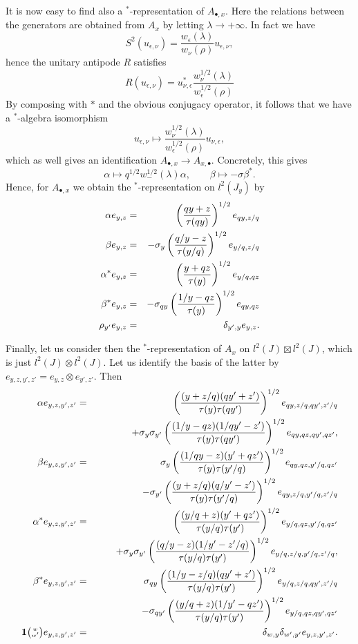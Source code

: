 It is now easy to find also a $^*$-representation of $A_{\bullet,x}$. Here the relations between the generators are obtained from $A_{x}$ by letting $\lambda\rightarrow +\infty$. In fact we have \[S^2(u_{\epsilon,\nu}) = \frac{w_{\epsilon}(\lambda)}{w_{\nu}(\rho)} u_{\epsilon,\nu},\] hence the unitary antipode $R$ satisfies \[ R(u_{\epsilon,\nu}) = u_{\nu,\epsilon}^* \frac{w_{\nu}^{1/2}(\lambda)}{w_{\epsilon}^{1/2}(\rho)}\] By composing with $*$ and the obvious conjugacy operator, it follows that we have a $^*$-algebra isomorphism \[u_{\epsilon,\nu} \mapsto  \frac{w_{\nu}^{1/2}(\lambda)}{w_{\epsilon}^{1/2}(\rho)}u_{\nu,\epsilon},\] which as well gives an identification $A_{\bullet,x}\rightarrow A_{x,\bullet}$. Concretely, this gives \[\alpha \mapsto q^{1/2}w_{-}^{1/2}(\lambda) \alpha,\qquad \beta \mapsto -\sigma\beta^*.\] Hence, for $A_{\bullet,x}$ we obtain the $^*$-representation on $l^2(J_{y})$ by \begin{eqnarray*} \alpha e_{y,z} &=&  \left(\frac{qy+z}{\operatorname{\tau}(qy)}\right)^{1/2}e_{qy,z/q}\\ \beta e_{y,z} &=&  - \sigma_{y} \left( \frac{q/y-z}{\operatorname{\tau}(y/q)}\right)^{1/2}e_{y/q,z/q}\\ \alpha^* e_{y,z} &=&  \left(\frac{y+qz}{\operatorname{\tau}(y)}\right)^{1/2}e_{y/q,qz}\\ \beta^* e_{y,z} &=&  - \sigma_{qy} \left( \frac{1/y-qz}{\operatorname{\tau}(y)}\right)^{1/2}e_{qy,qz}\\\rho_{y'}e_{y,z} &=& \delta_{y',y}e_{y,z}.\end{eqnarray*}

Finally, let us consider then the $^*$-representation of $A_{x}$ on $l^2(J)\boxtimes l^2(J)$, which is just $l^2(J)\otimes l^2(J)$. Let us identify the basis of the latter by $e_{y,z,y',z'} = e_{y,z}\otimes e_{y',z'}$. Then \begin{eqnarray*} \alpha e_{y,z,y',z'} &=& \left(\frac{(y+z/q)(qy'+z')}{\tau(y)\tau(qy')}\right)^{1/2}e_{qy,z/q,qy',z'/q}  \\ && \qquad + \sigma_{y}\sigma_{y'}\left(\frac{(1/y-qz)(1/qy' -z')}{\tau(y)\tau(qy')}\right)^{1/2}e_{qy,qz,qy',qz'}, \\
\beta e_{y,z,y',z'} &=&  \sigma_y \left(\frac{(1/qy-z)(y'+qz')}{\tau(y)\tau(y'/q)}\right)^{1/2}e_{qy,qz,y'/q,qz'}  \\ &&\qquad -\sigma_{y'}\left(\frac{(y+z/q)(q/y'-z')}{\tau(y)\tau(y'/q)}\right)^{1/2} e_{qy,z/q,y'/q,z'/q} \\\alpha^* e_{y,z,y',z'} &=& \left(\frac{(y/q+z)(y'+qz')}{\tau(y/q)\tau(y')}\right)^{1/2}e_{y/q,qz,y'/q,qz'}  \\ && \qquad + \sigma_{y}\sigma_{y'} \left(\frac{(q/y-z)(1/y' -z'/q)}{\tau(y/q)\tau(y')}\right)^{1/2}e_{y/q,z/q,y'/q,z'/q}, \\
\beta^* e_{y,z,y',z'} &=&  \sigma_{qy} \left(\frac{(1/y-z/q)(qy'+z')}{\tau(y/q)\tau(y')}\right)^{1/2}e_{y/q,z/q,qy',z'/q}  \\ &&\qquad -\sigma_{qy'}\left(\frac{(y/q+z)(1/y'-qz')}{\tau(y/q)\tau(y')}\right)^{1/2} e_{y/q,qz,qy',qz'}\\
\mathbf{1}{\tiny {\begin{pmatrix} w\\w'\end{pmatrix}}} e_{y,z,y',z'} &=& \delta_{w,y}\delta_{w',y'} e_{y,z,y',z'}.
\end{eqnarray*}

